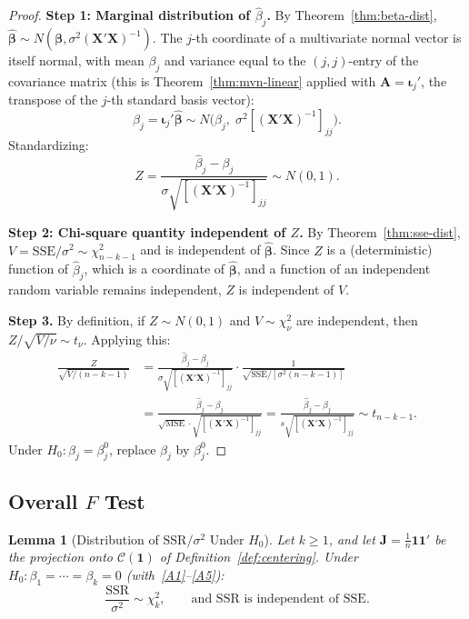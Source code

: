 \documentclass[14pt]{extarticle}
\theoremstyle{plain}
\newtheorem{lemma}[theorem]{Lemma}
\theoremstyle{definition}
\theoremstyle{remark}
\newcommand{\SSR}{\mathrm{SSR}}
\newcommand{\SSE}{\mathrm{SSE}}
\newcommand{\MSE}{\mathrm{MSE}}
\newcommand{\bX}{\mathbf{X}}
\def\bb{\boldsymbol{\beta}}
\newcommand{\bone}{\mathbf{1}}
\newcommand{\bA}{\mathbf{A}}
\newcommand{\calC}{\mathcal{C}}
\newcommand{\bJ}{\mathbf{J}}
\begin{document}
\begin{proof}
\textbf{Step 1: Marginal distribution of $\hat\beta_j$.} By Theorem~\ref{thm:beta-dist}, $\hat{\bb} \sim N(\bb, \sigma^2(\bX'\bX)^{-1})$. The $j$-th coordinate of a multivariate normal vector is itself normal, with mean $\beta_j$ and variance equal to the $(j,j)$-entry of the covariance matrix (this is Theorem~\ref{thm:mvn-linear} applied with $\bA = \boldsymbol\iota_j'$, the transpose of the $j$-th standard basis vector):
\[
\hat{\beta}_j = \boldsymbol\iota_j'\hat{\bb} \sim N\!\bigl(\beta_j,\; \sigma^2[(\bX'\bX)^{-1}]_{jj}\bigr).
\]
Standardizing:
\[
Z = \frac{\hat{\beta}_j - \beta_j}{\sigma\sqrt{[(\bX'\bX)^{-1}]_{jj}}} \sim N(0, 1).
\]

\textbf{Step 2: Chi-square quantity independent of $Z$.} By Theorem~\ref{thm:sse-dist}, $V = \SSE/\sigma^2 \sim \chi^2_{n-k-1}$ and is independent of $\hat{\bb}$. Since $Z$ is a (deterministic) function of $\hat{\beta}_j$, which is a coordinate of $\hat{\bb}$, and a function of an independent random variable remains independent, $Z$ is independent of $V$.

\textbf{Step 3.} By definition, if $Z \sim N(0,1)$ and $V \sim \chi^2_\nu$ are independent, then $Z/\sqrt{V/\nu} \sim t_\nu$. Applying this:
\begin{align*}
\frac{Z}{\sqrt{V/(n-k-1)}} &= \frac{\hat{\beta}_j - \beta_j}{\sigma\sqrt{[(\bX'\bX)^{-1}]_{jj}}} \cdot \frac{1}{\sqrt{\SSE/[\sigma^2(n-k-1)]}}\\
&= \frac{\hat{\beta}_j - \beta_j}{\sqrt{\MSE} \cdot \sqrt{[(\bX'\bX)^{-1}]_{jj}}} = \frac{\hat{\beta}_j - \beta_j}{s\sqrt{[(\bX'\bX)^{-1}]_{jj}}} \sim t_{n-k-1}.
\end{align*}
Under $H_0\colon \beta_j = \beta_j^0$, replace $\beta_j$ by $\beta_j^0$.
\end{proof}

\subsection{Overall \texorpdfstring{$F$}{F} Test}

\begin{lemma}[Distribution of $\SSR/\sigma^2$ Under $H_0$]\label{lem:SSR-chisq}
Let $k \geqslant 1$, and let $\bJ = \frac{1}{n}\bone\bone'$ be the projection onto $\calC(\bone)$ of Definition~\ref{def:centering}. Under $H_0\colon \beta_1 = \cdots = \beta_k = 0$ (with~\ref{A1}--\ref{A5}):
\[
\frac{\SSR}{\sigma^2} \sim \chi^2_k, \qquad \text{and } \SSR \text{ is independent of } \SSE.
\]
\end{lemma}
\end{document}
